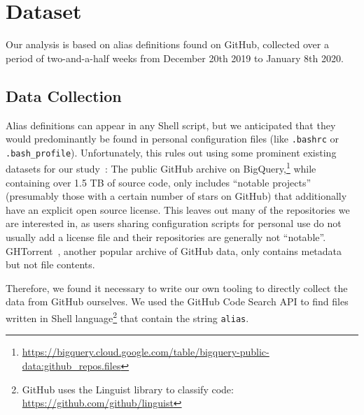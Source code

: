 \documentclass[smallextended,natbib]{svjour3}
\newcommand{\num}[1]{\numprint{#1}}
\begin{document}
\section{Dataset}

Our analysis is based on \num{2204199} alias definitions found on GitHub, collected over a period of two-and-a-half weeks from December 20th 2019 to January 8th 2020.

\subsection{Data Collection}

Alias definitions can appear in any Shell script, but we anticipated that they would predominantly be found in personal configuration files (like \verb|.bashrc| or \verb|.bash_profile|).
Unfortunately, this rules out using some prominent existing datasets for our study~\citep{mombach}:
The public GitHub archive on BigQuery,\footnote{\url{https://bigquery.cloud.google.com/table/bigquery-public-data:github_repos.files}} while containing over 1.5 TB of source code, only includes ``notable projects'' (presumably those with a certain number of stars on GitHub) that additionally have an explicit open source license. 
This leaves out many of the repositories we are interested in, as users sharing configuration scripts for personal use do not usually add a license file and their repositories are generally not ``notable''.
GHTorrent~\citep{ghtorrent}, another popular archive of GitHub data, only contains metadata but not file contents.

Therefore, we found it necessary to write our own tooling to directly collect the data from GitHub ourselves.
We used the GitHub Code Search API to find files written in Shell language\footnote{GitHub uses the Linguist library to classify code: \url{https://github.com/github/linguist}} that contain the string \verb|alias|.
\end{document}
